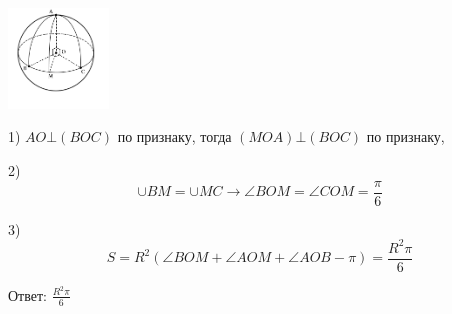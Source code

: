     \begin{center}
        \includegraphics[width=0.2\textwidth]{images/img2}\\
    \end{center}

    1) $AO \bot (BOC)$ по признаку, тогда $(MOA)\bot(BOC)$ по признаку,

    2) \[
           \cup BM = \cup MC \rightarrow \angle BOM = \angle COM = \frac{\pi}{6}
    \]

    3)
    \[
        S = R^2(\angle BOM + \angle AOM + \angle AOB - \pi) = \frac{R^2\pi}{6}
    \]

    Ответ: $\frac{R^2\pi}{6}$


